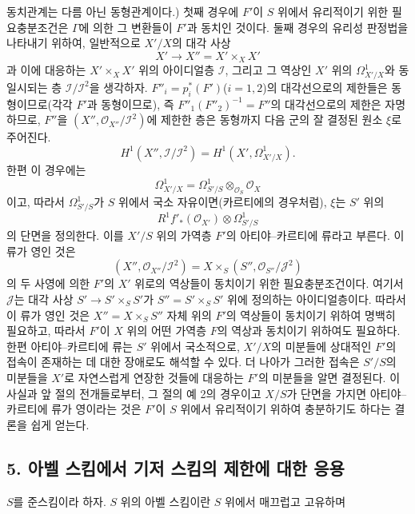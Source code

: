 \documentclass[11pt,twoside,openany]{book}
\numberwithin{equation}{section}
\newcommand{\sourceunit}{front}
\newcommand{\src}[1]{%
  \phantomsection\hypertarget{src:\sourceunit:#1}{}%
  \marginpar{\raggedleft\footnotesize\sffamily #1}%
}
\theoremstyle{plain}
\theoremstyle{definition}
\theoremstyle{remark}
\begin{document}
\src{323}
동치관계는 다름 아닌 동형관계이다.) 첫째 경우에 $F'$이 $S$ 위에서
유리적이기 위한 필요충분조건은 $\Gamma$에 의한 그 변환들이 $F'$과
동치인 것이다. 둘째 경우의 유리성 판정법을 나타내기 위하여, 일반적으로
$X'/X$의 대각 사상
\[
  X'\longrightarrow X''=X'\times_XX'
\]
과 이에 대응하는 $X'\times_XX'$ 위의 아이디얼층 $\mathcal I$, 그리고
그 역상인 $X'$ 위의 $\Omega^1_{X'/X}$와 동일시되는 층
$\mathcal I/\mathcal I^2$을 생각하자. $F''_i=p_i^*(F')$($i=1,2$)의
대각선으로의 제한들은 동형이므로(각각 $F'$과 동형이므로), 즉
$F''_1(F''_2)^{-1}=F''$의 대각선으로의 제한은 자명하므로, $F''$을
$(X'',\mathcal O_{X''}/\mathcal I^2)$에 제한한 층은 동형까지 다음 군의
잘 결정된 원소 $\xi$로 주어진다.
\[
  H^1(X'',\mathcal I/\mathcal I^2)
  =H^1(X',\Omega^1_{X'/X}).
\]
한편 이 경우에는
\[
  \Omega^1_{X'/X}
  =\Omega^1_{S'/S}\otimes_{\mathcal O_S}\mathcal O_X
\]
이고, 따라서 $\Omega^1_{S'/S}$가 $S$ 위에서 국소 자유이면(카르티에의
경우처럼), $\xi$는 $S'$ 위의
\[
  R^1f'_*(\mathcal O_{X'})\otimes\Omega^1_{S'/S}
\]
의 단면을 정의한다. 이를 $X'/S$ 위의 가역층 $F'$의
아티야--카르티에 류라고 부른다. 이 류가 영인 것은
\[
  (X'',\mathcal O_{X''}/\mathcal I^2)
  =X\times_S(S'',\mathcal O_{S''}/\mathcal J^2)
\]
의 두 사영에 의한 $F'$의 $X'$ 위로의 역상들이 동치이기 위한
필요충분조건이다. 여기서 $\mathcal J$는 대각 사상
$S'\longrightarrow S'\times_SS'$가 $S''=S'\times_SS'$ 위에 정의하는
아이디얼층이다. 따라서 이 류가 영인 것은 $X''=X\times_SS''$ 자체 위의
$F'$의 역상들이 동치이기 위하여 명백히 필요하고, 따라서 $F'$이 $X$ 위의
어떤 가역층 $F$의 역상과 동치이기 위하여도 필요하다. 한편
아티야--카르티에 류는 $S'$ 위에서 국소적으로, $X'/X$의 미분들에
상대적인 $F'$의 접속이 존재하는 데 대한 장애로도 해석할 수 있다. 더
나아가 그러한 접속은 $S'/S$의 미분들을 $X'$로 자연스럽게 연장한 것들에
대응하는 $F'$의 미분들을 알면 결정된다. 이 사실과 앞 절의 전개들로부터,
그 절의 예 2의 경우이고 $X/S$가 단면을 가지면 아티야--카르티에 류가
영이라는 것은 $F'$이 $S$ 위에서 유리적이기 위하여 충분하기도 하다는
결론을 쉽게 얻는다.

\subsection*{5. 아벨 스킴에서 기저 스킴의 제한에 대한 응용}

$S$를 준스킴이라 하자. $S$ 위의 아벨 스킴이란 $S$ 위에서 매끄럽고
고유하며
\end{document}
